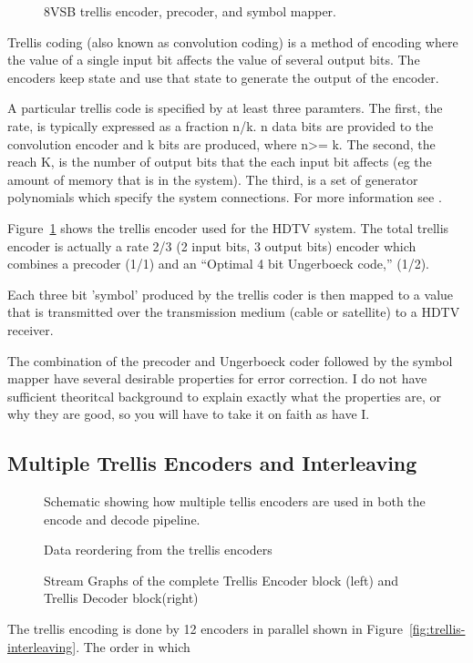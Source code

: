 
\begin{figure}
\center
\epsfxsize=4.5in
\caption{8VSB trellis encoder, precoder, and symbol mapper.}
\label{fig:trellis-system}
\end{figure}

Trellis coding (also known as convolution coding) 
is a method of encoding where the value of a single input 
bit affects the value of several output bits. The encoders
keep state and use that state to generate the output of the 
encoder. 

A particular trellis code is 
specified by at least three paramters. The first, the rate, is typically expressed as
a fraction n/k. n data bits are provided to the convolution encoder and k bits are produced,
where n>= k. The second, the reach K, is the number of output bits that the
each input bit affects (eg the amount of memory that is in the system). 
The third, is a set of generator polynomials which specify the system connections.
For more information see \cite{fleming:tutorial}.

Figure~\ref{fig:trellis-system} shows the trellis encoder used for the HDTV system. 
The total trellis encoder is actually a rate 2/3 (2 input bits, 3 output bits) 
encoder which combines a precoder (1/1) and an ``Optimal 4 bit 
Ungerboeck code,'' (1/2).

Each three bit 'symbol' produced by the trellis coder is then mapped to a value
that is transmitted over the transmission medium (cable or satellite) to 
a HDTV receiver. 

The combination of the precoder and Ungerboeck coder followed by the symbol mapper
have several desirable properties for error correction. I do not have sufficient
theoritcal background to explain exactly what the properties are, or why they are good,
so you will have to take it on faith as have I.








\subsection{Multiple Trellis Encoders and Interleaving}

\begin{figure}
\center

\epsfxsize=4.0in
\caption{Schematic showing how multiple tellis encoders are used in both the encode and decode pipeline.}
\label{fig:multiple-trellis}


\epsfxsize=4.0in
\caption{Data reordering from the trellis encoders}
\label{fig:trellis-interleaving}


\epsfxsize=4.0in
\epsfxsize=4.0in
\caption{Stream Graphs of the complete Trellis Encoder block (left) and Trellis Decoder block(right)}
\label{fig:sg-trellis-pipeline}

\end{figure}




The trellis encoding is done by 12 encoders in parallel shown in
Figure~\ref{fig:trellis-interleaving}. The
order in which 
